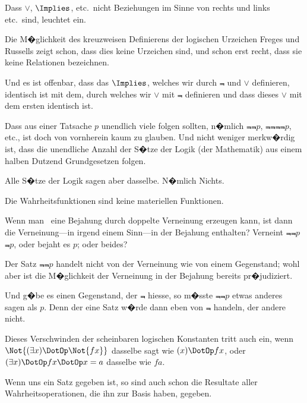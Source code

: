 {Dass $\lor$, $\Implies$, etc.\ nicht Beziehungen im Sinne von
rechts und links etc.\ sind, leuchtet ein.

Die M�glichkeit des kreuzweisen Definierens der
logischen \glqq{}Urzeichen\grqq{} Freges und Russells zeigt
schon, dass dies keine Urzeichen sind, und schon
erst recht, dass sie keine Relationen bezeichnen.

Und es ist offenbar, dass das \glqq{}$\Implies$\grqq{}, welches wir
durch \glqq{}$\Not{}$\grqq{} und \glqq{}$\lor$\grqq{} definieren, identisch ist mit dem,
durch welches wir \glqq{}$\lor$\grqq{} mit \glqq{}$\Not{}$\grqq{} definieren und dass
dieses \glqq{}$\lor$\grqq{} mit dem ersten identisch ist. \UndSoWeiter}


{Dass aus einer Tatsache $p$ unendlich viele
 folgen sollten, n�mlich $\Not{\Not{p}}$, $\Not{\Not{\Not{\Not{p}}}}$,
etc., ist doch von vornherein kaum zu glauben.
Und nicht weniger merkw�rdig ist, dass die unendliche
Anzahl der S�tze der Logik (der Mathematik)
aus einem halben Dutzend \glqq{}Grundgesetzen\grqq{} folgen.

Alle S�tze der Logik sagen aber dasselbe. N�mlich
Nichts.}


{Die Wahrheitsfunktionen sind keine materiellen
Funktionen.

Wenn man \zumBeispiel\ eine Bejahung durch doppelte
Verneinung erzeugen kann, ist dann die Verneinung---in
irgend einem Sinn\AllowBreak---in der Bejahung enthalten?
Verneint \glqq{}$\Not{\Not{p}}$\grqq{} $\Not{p}$, oder bejaht es $p$; oder beides?

Der Satz \glqq{}$\Not{\Not{p}}$\grqq{} handelt nicht von der Verneinung
wie von einem Gegenstand; wohl aber ist
die M�glichkeit der Verneinung in der Bejahung
bereits pr�judiziert.

Und g�be es einen Gegenstand, der \glqq{}$\Not{}$\grqq{} hiesse,
so m�sste \glqq{}$\Not{\Not{p}}$\grqq{} etwas anderes sagen als \glqq{}$p$\grqq{}.
Denn der eine Satz w�rde dann eben von $\Not{}$
handeln, der andere nicht.}


{Dieses Verschwinden der scheinbaren logischen
Konstanten tritt auch ein, wenn \glqq{}$\Not{(\exists x) \DotOp \Not{fx}}$\grqq{}
dasselbe sagt wie \glqq{}$(x) \DotOp fx$\grqq{}, oder \glqq{}$(\exists x) \DotOp fx \DotOp x = a$\grqq{}
dasselbe wie \glqq{}$fa$\grqq{}.}


{Wenn uns ein Satz gegeben ist, so sind  auch schon die Resultate aller Wahrheitsoperationen,
die ihn zur Basis haben, gegeben.}


